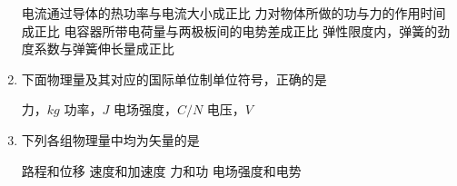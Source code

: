 \begin{enumerate}
\fourchoices
{电流通过导体的热功率与电流大小成正比}
{力对物体所做的功与力的作用时间成正比}
{电容器所带电荷量与两极板间的电势差成正比}
{弹性限度内，弹簧的劲度系数与弹簧伸长量成正比}


\item
{}
下面物理量及其对应的国际单位制单位符号，正确的是  

\fourchoices
{力，$ kg $}
{功率，$ J $}
{电场强度，$ C/N $}
{电压，$ V $}



\item 
{}
下列各组物理量中均为矢量的是  

\fourchoices
{路程和位移}
{速度和加速度}
{力和功}
{电场强度和电势}






	
	
	
\end{enumerate}

